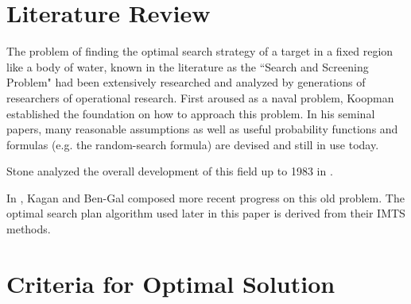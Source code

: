 \documentclass[12pt, letterpaper]{article}  %
\theoremstyle{definition}
\theoremstyle{remark}
\theoremstyle{plain}
\begin{document}
\begin{itemize}
\end{itemize}




\section{Literature Review}\label{sec:litrev}


The problem of finding the optimal search strategy of a target in a fixed region like a body of water, known in the literature as the ``Search and Screening Problem" had been extensively researched and analyzed by generations of researchers of operational research. First aroused as a naval problem, Koopman \cite{46koopman} established the foundation on how to approach this problem. In his seminal papers, many reasonable assumptions as well as useful probability functions and formulas (e.g. the random-search formula) are devised and still in use today.

Stone analyzed the overall development of this field up to 1983 in \cite{83stone}.


In \cite{13kagan}, Kagan and Ben-Gal composed more recent progress on this old problem. The optimal search plan algorithm used later in this paper is derived from their IMTS methods.






\section{Criteria for Optimal Solution}\label{sec:measure}

\end{document}
